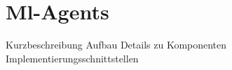 {\let\clearpage\relax\chapter{Ml-Agents}}
\label{sec:mlagents}
Kurzbeschreibung
Aufbau
Details zu Komponenten
Implementierungsschnittstellen